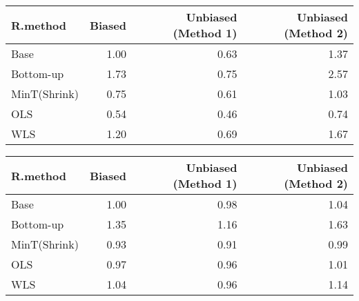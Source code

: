 \documentclass[
]{article}
\begin{document}
\begin{tabular}{l|r|r|r}
\hline
R.method & Biased & Unbiased (Method 1) & Unbiased (Method 2)\\
\hline
Base & 1.00 & 0.63 & 1.37\\
\hline
Bottom-up & 1.73 & 0.75 & 2.57\\
\hline
MinT(Shrink) & 0.75 & 0.61 & 1.03\\
\hline
OLS & 0.54 & 0.46 & 0.74\\
\hline
WLS & 1.20 & 0.69 & 1.67\\
\hline
\end{tabular}

\begin{tabular}{l|r|r|r}
\hline
R.method & Biased & Unbiased (Method 1) & Unbiased (Method 2)\\
\hline
Base & 1.00 & 0.98 & 1.04\\
\hline
Bottom-up & 1.35 & 1.16 & 1.63\\
\hline
MinT(Shrink) & 0.93 & 0.91 & 0.99\\
\hline
OLS & 0.97 & 0.96 & 1.01\\
\hline
WLS & 1.04 & 0.96 & 1.14\\
\hline
\end{tabular}
\end{document}

